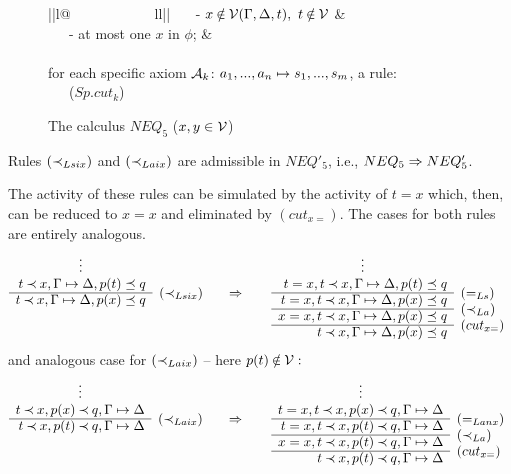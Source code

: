 \begin{figure}[hbt]
\begin{tabular}{||l@{\ \ \ \ \ \ \ \ \ \ \ \ }ll||}
{\footnotesize \ \ \ - $x\not\in \Vars(\Gamma,\Delta,t),\ t\not\in\Vars$}
    &  \multicolumn{2}{l||}{{\footnotesize \ \ \
 - $x\not\in \Vars(t,\Gamma,\Delta,y),\ t\not\in\Vars$}} \\
 {\footnotesize \ \ \ - at most one $x$ in $\phi$;} 
  &   \\[2ex]
%
\\
{for each specific axiom ${\cal {A}}_k$: \(a_1,...,a_n\mathrel{\mapsto} s_1,...,s_m\), 
a  rule:}\\[1ex]
\multicolumn{3}{||c||}
{ 
{\Gamma\Seq\Delta}\ \ \ ($Sp.cut_k$)} \\
 \hline\hline
\end{tabular} 
\caption{The calculus $NEQ_5$ ($x,y\in{\cal V}$)}\label{fi:neq51}
\end{figure}

\begin{LEMMA}\label{le:primeto5}
Rules $(\mathbin{\prec}_{Lsix})$ and $(\mathbin{\prec}_{Laix})$ are 
admissible in $NEQ'_5$, i.e., $NEQ_5\mathrel\Rightarrow NEQ'_5$.
\end{LEMMA}
\begin{PROOF}
The activity of these rules can be simulated by the activity
of $t=x$ which, then, can be reduced to $x=x$ and eliminated by $(cut_{x=})$.
The cases for both rules are entirely analogous.
\[\prar{
\multicolumn{1}{c}{\vdots} \\
t\Incl x, \GSD, p(t)\preceq q \cl
t\Incl x, \GSD, p(x)\preceq q & \rabove{\Lsix\ \ \ \ \ \impl\ \ \ \ \ }
}%
\prar{
\multicolumn{1}{c}{\vdots} \\
t=x, t\Incl x, \GSD, p(t)\preceq q \cl
t=x, t\Incl x, \GSD, p(x)\preceq q & \rabove{\eLs} \cl
x=x, t\Incl x, \GSD, p(x)\preceq q & \rabove{\iLa} \cl
     t\Incl x, \GSD, p(x)\preceq q & \rabove{(cut_{x=})}
}
\]
and analogous case for $(\mathbin{\prec}_{Laix})$ -- here $p(t)\not\in\Vars:$
\[\prar{
\multicolumn{1}{c}{\vdots} \\
t\Incl x, p(x)\Incl q,\GSD \cl
t\Incl x, p(t)\Incl q,\GSD & \rabove{\Laix\ \ \ \ \ \impl\ \ \ \ \ }
}%
\prar{
\multicolumn{1}{c}{\vdots} \\
t=x, t\Incl x, p(x)\Incl q, \GSD \cl
t=x, t\Incl x, p(t)\Incl q, \GSD & \rabove{\eLanx} \cl
x=x, t\Incl x, p(t)\Incl q, \GSD & \rabove{\iLa} \cl
     t\Incl x, p(t)\Incl q, \GSD & \rabove{(cut_{x=})}
}
\]
\end{PROOF}

